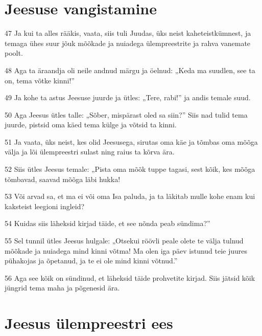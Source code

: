 \section*{Jeesuse vangistamine}

\par 47 Ja kui ta alles rääkis, vaata, siis tuli Juudas, üks neist kaheteistkümnest, ja temaga ühes suur jõuk mõõkade ja nuiadega ülempreestrite ja rahva vanemate poolt.
\par 48 Aga ta äraandja oli neile andnud märgu ja öelnud: „Keda ma suudlen, see ta on, tema võtke kinni!”
\par 49 Ja kohe ta astus Jeesuse juurde ja ütles: „Tere, rabi!” ja andis temale suud.
\par 50 Aga Jeesus ütles talle: „Sõber, mispärast oled sa siin?” Siis nad tulid tema juurde, pistsid oma käed tema külge ja võtsid ta kinni.
\par 51 Ja vaata, üks neist, kes olid Jeesusega, sirutas oma käe ja tõmbas oma mõõga välja ja lõi ülempreestri sulast ning raius ta kõrva ära.
\par 52 Siis ütles Jeesus temale: „Pista oma mõõk tuppe tagasi, sest kõik, kes mõõga tõmbavad, saavad mõõga läbi hukka!
\par 53 Või arvad sa, et ma ei või oma Isa paluda, ja ta läkitab mulle kohe enam kui kaksteist leegioni ingleid?
\par 54 Kuidas siis läheksid kirjad täide, et see nõnda peab sündima?”
\par 55 Sel tunnil ütles Jeesus hulgale: „Otsekui röövli peale olete te välja tulnud mõõkade ja nuiadega mind kinni võtma! Ma olen iga päev istunud teie juures pühakojas ja õpetanud, ja te ei ole mind kinni võtnud.”
\par 56 Aga see kõik on sündinud, et läheksid täide prohvetite kirjad. Siis jätsid kõik jüngrid tema maha ja põgenesid ära.

\section*{Jeesus ülempreestri ees}

